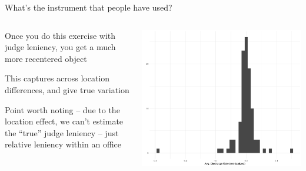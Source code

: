 \documentclass[notes,11pt, aspectratio=169]{beamer}
\newenvironment{wideitemize}{\itemize\addtolength{\itemsep}{10pt}}{\enditemize}
\begin{document}
\begin{frame}{What's the instrument that people have used?}
    \begin{columns}[onlytextwidth, T] %
      \begin{column}{.5\textwidth}
        \begin{wideitemize}
        \item Once you do this exercise with judge leniency, you get a
          much more recentered object
        \item This captures across location differences, and give true variation
        \item Point worth noting -- due to the location effect, we
          can't estimate the ``true'' judge leniency -- just relative
          leniency within an office
        \end{wideitemize}
      \end{column}%
      \hfill%
      \begin{column}{.5\textwidth}
        \includegraphics[width=\linewidth]{images/leniency_res.png}
      \end{column}%
    \end{columns}
\end{frame}
\end{document}
